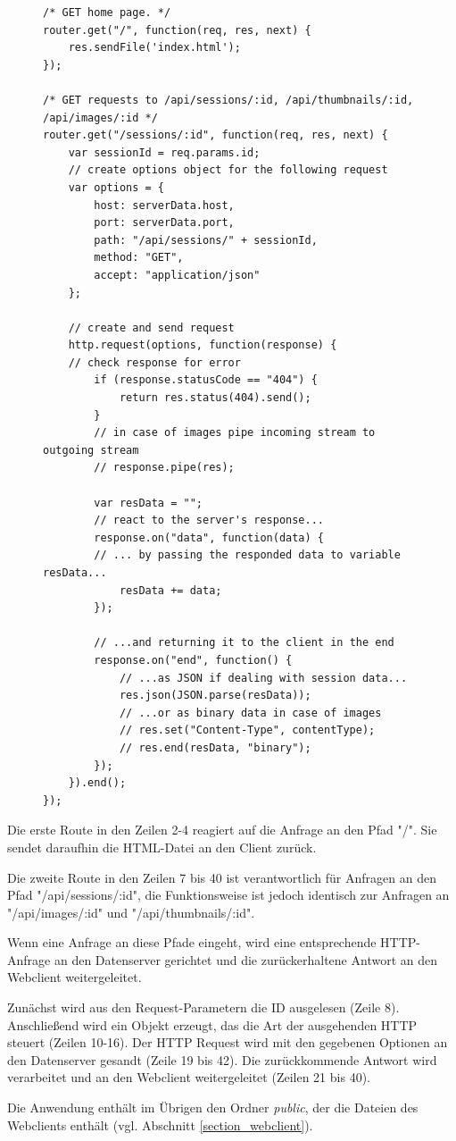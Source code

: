 \begin{figure}
\begin{lstlisting}[caption={Auszug aus den Dateien routes/index.js und routes/apiRoutes.js}, label=list_api]
/* GET home page. */
router.get("/", function(req, res, next) {
    res.sendFile('index.html');
});

/* GET requests to /api/sessions/:id, /api/thumbnails/:id, /api/images/:id */
router.get("/sessions/:id", function(req, res, next) {
    var sessionId = req.params.id;
    // create options object for the following request
	var options = {
		host: serverData.host,
		port: serverData.port,
		path: "/api/sessions/" + sessionId,
		method: "GET",
		accept: "application/json"
	};

	// create and send request
	http.request(options, function(response) {
	// check response for error
	    if (response.statusCode == "404") {
	        return res.status(404).send();
		}
		// in case of images pipe incoming stream to outgoing stream
		// response.pipe(res);
		
		var resData = "";
		// react to the server's response...
		response.on("data", function(data) {
		// ... by passing the responded data to variable resData...
		    resData += data;
		});
		
		// ...and returning it to the client in the end
		response.on("end", function() {
		    // ...as JSON if dealing with session data...
		    res.json(JSON.parse(resData));
		    // ...or as binary data in case of images
		    // res.set("Content-Type", contentType);
		    // res.end(resData, "binary");
		});
	}).end();
});
\end{lstlisting}
\end{figure}

Die erste Route in den Zeilen 2-4 reagiert auf die Anfrage an den Pfad "/".
Sie sendet daraufhin die HTML-Datei an den Client zurück.

Die zweite Route in den Zeilen 7 bis 40 ist verantwortlich für Anfragen an den Pfad 
"/api/sessions/:id", die Funktionsweise ist jedoch identisch zur Anfragen 
an "/api/images/:id"{} und "/api/thumbnails/:id".

Wenn eine Anfrage an diese Pfade eingeht, wird eine entsprechende HTTP-Anfrage 
an den Datenserver gerichtet und die zurückerhaltene Antwort an den Webclient 
weitergeleitet.

Zunächst wird aus den Request-Parametern die ID ausgelesen (Zeile 8). Anschließend 
wird ein Objekt erzeugt, das die Art der ausgehenden HTTP steuert (Zeilen 10-16).
Der HTTP Request wird mit den gegebenen Optionen an den Datenserver gesandt (Zeile 19 bis 42).
Die zurückkommende Antwort wird verarbeitet und an den Webclient weitergeleitet (Zeilen 21 bis 40).

Die Anwendung enthält im Übrigen den Ordner \textit{public}, der die Dateien des Webclients 
enthält (vgl. Abschnitt \ref{section_webclient}).


